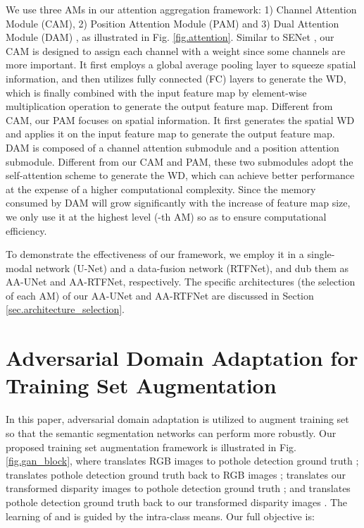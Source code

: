 \documentclass[runningheads]{llncs}
\begin{document}
We use three AMs in our attention aggregation framework: 1) Channel Attention Module (CAM), 2) Position Attention Module (PAM) and 3) Dual Attention Module (DAM) \cite{fu2019dual}, as illustrated in Fig. \ref{fig.attention}. Similar to SENet \cite{hu2018squeeze}, our CAM is designed to assign each channel with a weight since some channels are more important. It first employs a global average pooling layer to squeeze spatial information, and then utilizes fully connected (FC) layers to generate the WD, which is finally combined with the input feature map by element-wise multiplication operation to generate the output feature map. Different from CAM, our PAM focuses on spatial information. It first generates the spatial WD and applies it on the input feature map to generate the output feature map. DAM \cite{fu2019dual} is composed of a channel attention submodule and a position attention submodule. Different from our CAM and PAM, these two submodules adopt the self-attention scheme to generate the WD, which can achieve better performance at the expense of a higher computational complexity. Since the memory consumed by DAM will grow significantly with the increase of feature map size, we only  use it at the highest level (-th AM) so as to ensure computational efficiency.

To demonstrate the effectiveness of our framework, we employ it in a single-modal network (U-Net) and a data-fusion network (RTFNet), and dub them as AA-UNet and AA-RTFNet, respectively. The specific architectures (the selection of each AM) of our AA-UNet and AA-RTFNet are discussed  in Section \ref{sec.architecture_selection}.


\section{Adversarial Domain Adaptation for Training Set Augmentation}
\label{sec.gan_data_augmentation}

In this paper, adversarial domain adaptation is utilized to augment training set so that  the semantic segmentation networks can perform more robustly. Our proposed training set augmentation framework is illustrated in Fig. \ref{fig.gan_block}, where  translates RGB images  to pothole detection ground truth ;
 translates
pothole detection ground truth  back to RGB images ;  translates our transformed disparity images  to pothole detection ground truth ;
and  translates
pothole detection ground truth  back to our transformed disparity images . The learning of  and  is guided by the intra-class means. Our full objective is:
\end{document}
